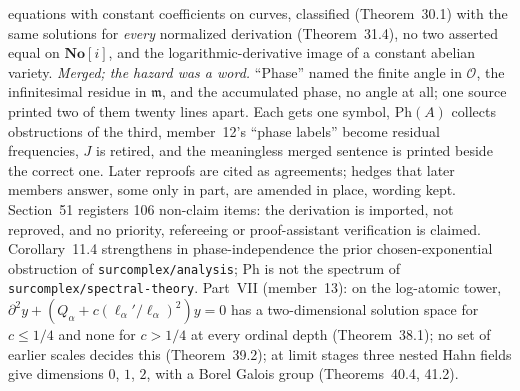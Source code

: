 \documentclass[11pt]{article}
\newcommand{\SC}{\mathbf{No}[i]}
\newcommand{\der}{\partial}
\begin{document}
{equations with constant coefficients on curves, classified (Theorem~30.1) with
the same solutions for \emph{every} normalized derivation (Theorem~31.4), no
two asserted equal on $\SC$, and the logarithmic-derivative image of a constant
abelian variety.  \emph{Merged; the hazard was a word.}  ``Phase'' named the
finite angle in $\mathcal{O}$, the infinitesimal residue in $\mathfrak{m}$, and
the accumulated phase, no angle at all; one source printed two of them twenty
lines apart.  Each gets one symbol, $\mathrm{Ph}(A)$ collects obstructions of
the third, member~12's ``phase labels'' become residual frequencies, $J$ is
retired, and the meaningless merged sentence is printed beside the correct one.
Later reproofs are cited as agreements; hedges that later members answer, some
only in part, are amended in place, wording kept.  Section~51 registers 106
non-claim items: the derivation is imported, not reproved, and no priority,
refereeing or proof-assistant verification is claimed.  Corollary~11.4
strengthens in phase-independence the prior chosen-exponential obstruction of
\nolinkurl{surcomplex/analysis}; $\mathrm{Ph}$ is not the spectrum of
\nolinkurl{surcomplex/spectral-theory}.  Part~VII (member~13): on the log-atomic tower,
$\der^2y+(Q_\alpha+c(\ell_\alpha'/\ell_\alpha)^2)y=0$ has a two-dimensional
solution space for $c\le1/4$ and none for $c>1/4$ at every ordinal depth
(Theorem~38.1); no set of earlier scales decides this (Theorem~39.2); at limit
stages three nested Hahn fields give dimensions $0$, $1$, $2$, with a Borel
Galois group (Theorems~40.4, 41.2).}
\end{document}
